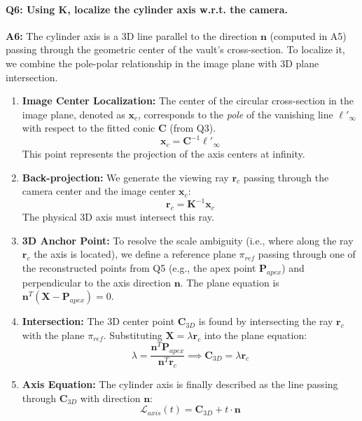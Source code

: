 \documentclass[a4paper,11pt]{article}
\newcommand{\matr}[1]{\bm{#1}}     %
\newcommand{\vect}[1]{\mathbf{#1}}  %
\begin{document}

\paragraph{Q6: Using $\matr{K}$, localize the cylinder axis w.r.t. the camera.}

\textbf{A6:} The cylinder axis is a 3D line parallel to the direction $\vect{n}$ (computed in A5) passing through the geometric center of the vault's cross-section.
To localize it, we combine the pole-polar relationship in the image plane with 3D plane intersection.

\begin{enumerate}
    \item \textbf{Image Center Localization:} The center of the circular cross-section in the image plane, denoted as $\vect{x}_c$, corresponds to the \textit{pole} of the vanishing line $\ell'_\infty$ with respect to the fitted conic $\matr{C}$ (from Q3). 
    \begin{equation}
        \vect{x}_c = \matr{C}^{-1} \ell'_\infty
    \end{equation}
    This point represents the projection of the axis centers at infinity.
    
    \item \textbf{Back-projection:} We generate the viewing ray $\vect{r}_c$ passing through the camera center and the image center $\vect{x}_c$:
    \begin{equation}
        \vect{r}_c = \matr{K}^{-1} \vect{x}_c
    \end{equation}
    The physical 3D axis must intersect this ray.
    
    \item \textbf{3D Anchor Point:} To resolve the scale ambiguity (i.e., where along the ray $\vect{r}_c$ the axis is located), we define a reference plane $\pi_{ref}$ passing through one of the reconstructed points from Q5 (e.g., the apex point $\vect{P}_{apex}$) and perpendicular to the axis direction $\vect{n}$. The plane equation is $\vect{n}^T (\vect{X} - \vect{P}_{apex}) = 0$.
    
    \item \textbf{Intersection:} The 3D center point $\vect{C}_{3D}$ is found by intersecting the ray $\vect{r}_c$ with the plane $\pi_{ref}$. Substituting $\vect{X} = \lambda \vect{r}_c$ into the plane equation:
    \begin{equation}
        \lambda = \frac{\vect{n}^T \vect{P}_{apex}}{\vect{n}^T \vect{r}_c} \implies \vect{C}_{3D} = \lambda \vect{r}_c
    \end{equation}
    
    \item \textbf{Axis Equation:} The cylinder axis is finally described as the line passing through $\vect{C}_{3D}$ with direction $\vect{n}$:
    \begin{equation}
        \mathcal{L}_{axis}(t) = \vect{C}_{3D} + t \cdot \vect{n}
    \end{equation}
\end{enumerate}
\end{document}
